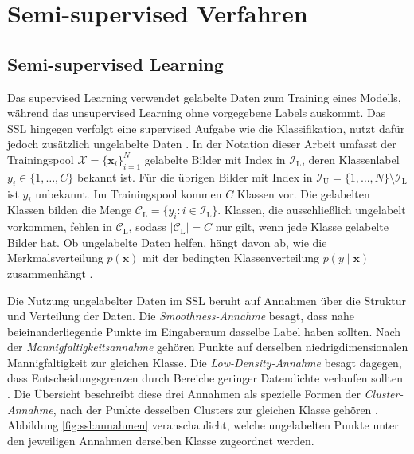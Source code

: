 \chapter{Semi-supervised Verfahren}
\label{chap:ssdml}

\section{Semi-supervised Learning}
\label{sec:ssl}

Das supervised Learning verwendet gelabelte Daten zum Training eines Modells, während das unsupervised Learning ohne vorgegebene Labels auskommt. Das \acl{SSL} hingegen verfolgt eine supervised Aufgabe wie die Klassifikation, nutzt dafür jedoch zusätzlich ungelabelte Daten \cite{van_engelen_survey_2019}. In der Notation dieser Arbeit umfasst der Trainingspool $\mathcal{X}=\{\bm{x}_i\}_{i=1}^{N}$ gelabelte Bilder mit Index in $\mathcal{I}_{\mathrm{L}}$, deren Klassenlabel $y_i\in\{1,\dots,C\}$ bekannt ist. Für die übrigen Bilder mit Index in $\mathcal{I}_{\mathrm{U}}=\{1,\dots,N\}\setminus\mathcal{I}_{\mathrm{L}}$ ist $y_i$ unbekannt. Im Trainingspool kommen $C$ Klassen vor. Die gelabelten Klassen bilden die Menge $\mathcal{C}_{\mathrm{L}}=\{y_i:i\in\mathcal{I}_{\mathrm{L}}\}$. Klassen, die ausschließlich ungelabelt vorkommen, fehlen in $\mathcal{C}_{\mathrm{L}}$, sodass $|\mathcal{C}_{\mathrm{L}}|=C$ nur gilt, wenn jede Klasse gelabelte Bilder hat. Ob ungelabelte Daten helfen, hängt davon ab, wie die Merkmalsverteilung $p(\bm{x})$ mit der bedingten Klassenverteilung $p(y\mid\bm{x})$ zusammenhängt \cite{van_engelen_survey_2019}.

Die Nutzung ungelabelter Daten im \ac{SSL} beruht auf Annahmen über die Struktur und Verteilung der Daten. Die \emph{Smoothness-Annahme} besagt, dass nahe beieinanderliegende Punkte im Eingaberaum dasselbe Label haben sollten. Nach der \emph{Mannigfaltigkeitsannahme} gehören Punkte auf derselben niedrigdimensionalen Mannigfaltigkeit zur gleichen Klasse. Die \emph{Low-Density-Annahme} besagt dagegen, dass Entscheidungsgrenzen durch Bereiche geringer Datendichte verlaufen sollten \cite{van_engelen_survey_2019}. Die Übersicht beschreibt diese drei Annahmen als spezielle Formen der \emph{Cluster-Annahme}, nach der Punkte desselben Clusters zur gleichen Klasse gehören \cite{van_engelen_survey_2019}. Abbildung \ref{fig:ssl:annahmen} veranschaulicht, welche ungelabelten Punkte unter den jeweiligen Annahmen derselben Klasse zugeordnet werden.

